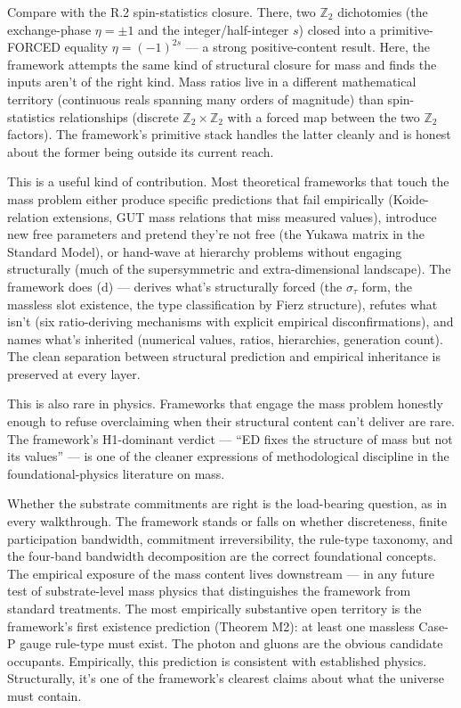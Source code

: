 \documentclass[11pt,a4paper]{article}
\begin{document}
Compare with the R.2 spin-statistics closure. There, two $\mathbb{Z}_2$ dichotomies (the exchange-phase $\eta = \pm 1$ and the integer/half-integer $s$) closed into a primitive-FORCED equality $\eta = (-1)^{2s}$ --- a strong positive-content result. Here, the framework attempts the same kind of structural closure for mass and finds the inputs aren't of the right kind. Mass ratios live in a different mathematical territory (continuous reals spanning many orders of magnitude) than spin-statistics relationships (discrete $\mathbb{Z}_2 \times \mathbb{Z}_2$ with a forced map between the two $\mathbb{Z}_2$ factors). The framework's primitive stack handles the latter cleanly and is honest about the former being outside its current reach.

This is a useful kind of contribution. Most theoretical frameworks that touch the mass problem either produce specific predictions that fail empirically (Koide-relation extensions, GUT mass relations that miss measured values), introduce new free parameters and pretend they're not free (the Yukawa matrix in the Standard Model), or hand-wave at hierarchy problems without engaging structurally (much of the supersymmetric and extra-dimensional landscape). The framework does (d) --- derives what's structurally forced (the $\sigma_\tau$ form, the massless slot existence, the type classification by Fierz structure), refutes what isn't (six ratio-deriving mechanisms with explicit empirical disconfirmations), and names what's inherited (numerical values, ratios, hierarchies, generation count). The clean separation between structural prediction and empirical inheritance is preserved at every layer.

This is also rare in physics. Frameworks that engage the mass problem honestly enough to refuse overclaiming when their structural content can't deliver are rare. The framework's H1-dominant verdict --- ``ED fixes the structure of mass but not its values'' --- is one of the cleaner expressions of methodological discipline in the foundational-physics literature on mass.

Whether the substrate commitments are right is the load-bearing question, as in every walkthrough. The framework stands or falls on whether discreteness, finite participation bandwidth, commitment irreversibility, the rule-type taxonomy, and the four-band bandwidth decomposition are the correct foundational concepts. The empirical exposure of the mass content lives downstream --- in any future test of substrate-level mass physics that distinguishes the framework from standard treatments. The most empirically substantive open territory is the framework's first existence prediction (Theorem M2): at least one massless Case-P gauge rule-type must exist. The photon and gluons are the obvious candidate occupants. Empirically, this prediction is consistent with established physics. Structurally, it's one of the framework's clearest claims about what the universe must contain.
\end{document}

